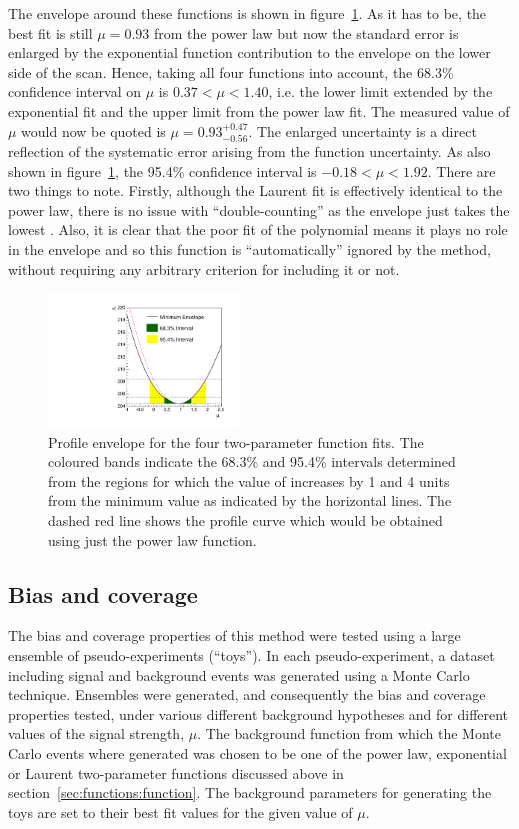 The envelope around these functions is shown in
figure~\ref{fig:functions:envelope}.
As it has to be, the best fit is still $\mu=0.93$ from the power law
but now the standard error is enlarged by the exponential function
contribution to the
envelope on the lower side of the scan. Hence, taking all four functions into
account, the 68.3\% confidence interval on $\mu$ is
$0.37 < \mu < 1.40 $, i.e. the lower limit extended by
the exponential fit and the upper limit from the power law fit.
The measured value of $\mu$ would now be quoted is
$\mu = 0.93_{-0.56}^{+0.47}$.
The enlarged uncertainty is a direct reflection of the
systematic error arising from the function uncertainty.
As also shown in figure~\ref{fig:functions:envelope}, the 95.4\% confidence
interval is $-0.18 < \mu < 1.92$.
There are two things to note. Firstly, although the Laurent fit
is effectively identical to the power law, there is no issue with
``double-counting'' as the envelope just takes the lowest \nll.
Also, it is clear that the poor fit of the polynomial
means it plays no role in the envelope and so this function is
``automatically'' ignored by the method,
without requiring any arbitrary criterion for
including it or not.
%
\begin{figure}[tbp]
\centering
\includegraphics[width=0.45\textwidth]{functions/Envelope.pdf}
\caption{Profile \nll envelope for the four two-parameter function fits.
The coloured bands indicate the 68.3\% and 95.4\% intervals determined from the regions
for which the value of \nll increases by 1 and 4 units from the minimum value as indicated by the horizontal lines. The dashed red line shows the profile \nll
curve which would be obtained using just the power law function.}
\label{fig:functions:envelope}
\end{figure}


\subsection{Bias and coverage}
\label{sec:functions:coverage}

The bias and coverage properties of this method were tested
using a large ensemble of
pseudo-experiments (``toys''). In each pseudo-experiment, a
dataset including signal and background events was generated using a Monte Carlo technique.
Ensembles were generated, and consequently the bias and coverage properties tested, under various different background hypotheses and for different values of the signal strength, $\mu$. The background function from which the Monte Carlo events where generated was chosen to be one of the power law,
exponential or Laurent two-parameter functions discussed above in
section~\ref{sec:functions:function}. The background parameters for generating the toys are set to their best fit values for the given value of $\mu$.

